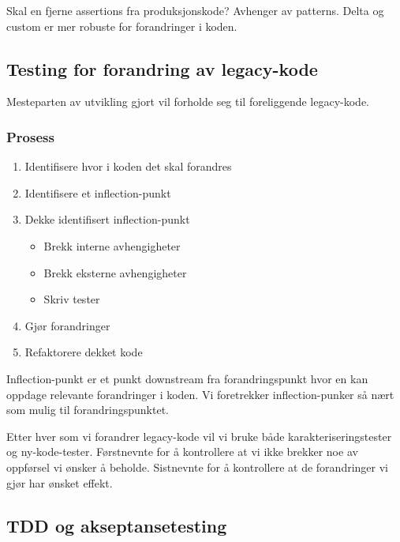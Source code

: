 Skal en fjerne assertions fra produksjonskode? Avhenger av patterns.
Delta og custom er mer robuste for forandringer i koden.

\subsection{Testing for forandring av legacy-kode}

Mesteparten av utvikling gjort vil forholde seg til foreliggende
legacy-kode.

\subsubsection{Prosess}

\begin{enumerate}[1.]
\item
  Identifisere hvor i koden det skal forandres
\item
  Identifisere et inflection-punkt
\item
  Dekke identifisert inflection-punkt
  \begin{itemize}
  \item
    Brekk interne avhengigheter
  \item
    Brekk eksterne avhengigheter
  \item
    Skriv tester
  \end{itemize}
\item
  Gjør forandringer
\item
  Refaktorere dekket kode
\end{enumerate}
Inflection-punkt er et punkt downstream fra forandringspunkt hvor en kan
oppdage relevante forandringer i koden. Vi foretrekker inflection-punker
så nært som mulig til forandringspunktet.

Etter hver som vi forandrer legacy-kode vil vi bruke både
karakteriseringstester og ny-kode-tester. Førstnevnte for å kontrollere
at vi ikke brekker noe av oppførsel vi ønsker å beholde. Sistnevnte for
å kontrollere at de forandringer vi gjør har ønsket effekt.

\subsection{TDD og akseptansetesting}

